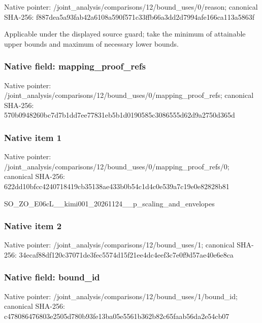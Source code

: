 \documentclass[10pt,a4paper]{article}
\begin{document}
Native pointer: /joint\_analysis/comparis\allowbreak{}ons/12/bound\_uses/0/reas\allowbreak{}on; canonical SHA-256: f887dea5a93fab42a6108a59\allowbreak{}0f571c33ffb66a3dd2d7994a\allowbreak{}fe166ca113a5863f


Applicable under the displayed source guard; take the minimum of attainable upper bounds and maximum of necessary lower bounds.


\subsubsection{Native field: mapping\_proof\_refs}


Native pointer: /joint\_analysis/comparis\allowbreak{}ons/12/bound\_uses/0/mapp\allowbreak{}ing\_proof\_refs; canonical SHA-256: 570b0948260bc7d7b1dd7ee7\allowbreak{}7831eb5b1d0190585c308655\allowbreak{}5d62d9a2750d365d



\subsubsection{Native item 1}


Native pointer: /joint\_analysis/comparis\allowbreak{}ons/12/bound\_uses/0/mapp\allowbreak{}ing\_proof\_refs/0; canonical SHA-256: 622dd10bfcc4240718419cb3\allowbreak{}5138ae433b0b54c1d4c0e539\allowbreak{}a7c19e0e82828b81


SO\_ZO\_E06cL\_\_kimi001\_202\allowbreak{}61124\_\_p\_scaling\_and\_env\allowbreak{}elopes


\subsubsection{Native item 2}


Native pointer: /joint\_analysis/comparis\allowbreak{}ons/12/bound\_uses/1; canonical SHA-256: 34ecaf88df120c37071de3fe\allowbreak{}c5574d15f21ee4dc4eef3c7e\allowbreak{}0f9d57ae40e6e8ca



\subsubsection{Native field: bound\_id}


Native pointer: /joint\_analysis/comparis\allowbreak{}ons/12/bound\_uses/1/boun\allowbreak{}d\_id; canonical SHA-256: c478086476803e2505d780b9\allowbreak{}3fe13ba05e5561b362b82c65\allowbreak{}faab56da2e54cb07
\end{document}

